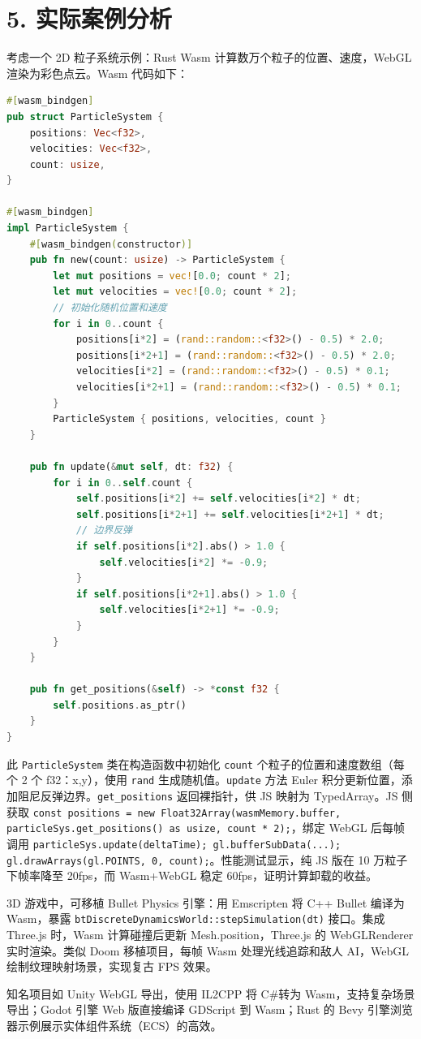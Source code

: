 \chapter{5. 实际案例分析}
考虑一个 2D 粒子系统示例：Rust Wasm 计算数万个粒子的位置、速度，WebGL 渲染为彩色点云。Wasm 代码如下：\par
\begin{lstlisting}[language=rust]
#[wasm_bindgen]
pub struct ParticleSystem {
    positions: Vec<f32>,
    velocities: Vec<f32>,
    count: usize,
}

#[wasm_bindgen]
impl ParticleSystem {
    #[wasm_bindgen(constructor)]
    pub fn new(count: usize) -> ParticleSystem {
        let mut positions = vec![0.0; count * 2];
        let mut velocities = vec![0.0; count * 2];
        // 初始化随机位置和速度
        for i in 0..count {
            positions[i*2] = (rand::random::<f32>() - 0.5) * 2.0;
            positions[i*2+1] = (rand::random::<f32>() - 0.5) * 2.0;
            velocities[i*2] = (rand::random::<f32>() - 0.5) * 0.1;
            velocities[i*2+1] = (rand::random::<f32>() - 0.5) * 0.1;
        }
        ParticleSystem { positions, velocities, count }
    }

    pub fn update(&mut self, dt: f32) {
        for i in 0..self.count {
            self.positions[i*2] += self.velocities[i*2] * dt;
            self.positions[i*2+1] += self.velocities[i*2+1] * dt;
            // 边界反弹
            if self.positions[i*2].abs() > 1.0 {
                self.velocities[i*2] *= -0.9;
            }
            if self.positions[i*2+1].abs() > 1.0 {
                self.velocities[i*2+1] *= -0.9;
            }
        }
    }

    pub fn get_positions(&self) -> *const f32 {
        self.positions.as_ptr()
    }
}
\end{lstlisting}
此 \texttt{ParticleSystem} 类在构造函数中初始化 \texttt{count} 个粒子的位置和速度数组（每个 2 个 f32：x,y），使用 \texttt{rand} 生成随机值。\texttt{update} 方法 Euler 积分更新位置，添加阻尼反弹边界。\texttt{get\_{}positions} 返回裸指针，供 JS 映射为 TypedArray。JS 侧获取 \texttt{const positions = new Float32Array(wasmMemory.buffer, particleSys.get\_{}positions() as usize, count * 2);}，绑定 WebGL 后每帧调用 \texttt{particleSys.update(deltaTime); gl.bufferSubData(...); gl.drawArrays(gl.POINTS, 0, count);}。性能测试显示，纯 JS 版在 10 万粒子下帧率降至 20fps，而 Wasm+WebGL 稳定 60fps，证明计算卸载的收益。\par
3D 游戏中，可移植 Bullet Physics 引擎：用 Emscripten 将 C++ Bullet 编译为 Wasm，暴露 \texttt{btDiscreteDynamicsWorld::stepSimulation(dt)} 接口。集成 Three.js 时，Wasm 计算碰撞后更新 Mesh.position，Three.js 的 WebGLRenderer 实时渲染。类似 Doom 移植项目，每帧 Wasm 处理光线追踪和敌人 AI，WebGL 绘制纹理映射场景，实现复古 FPS 效果。\par
知名项目如 Unity WebGL 导出，使用 IL2CPP 将 C\#{}转为 Wasm，支持复杂场景导出；Godot 引擎 Web 版直接编译 GDScript 到 Wasm；Rust 的 Bevy 引擎浏览器示例展示实体组件系统（ECS）的高效。\par

